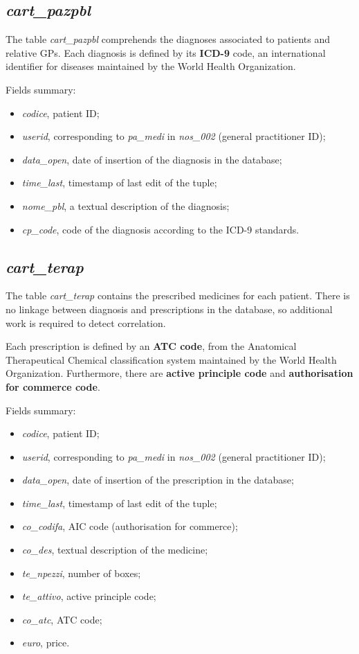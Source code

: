 \subsection{\textit{cart\_pazpbl}}
The table \textit{cart\_pazpbl} comprehends the diagnoses associated to patients and relative GPs. Each diagnosis is defined by its \textbf{ICD-9} code, an international identifier for diseases maintained by the World Health Organization. 

Fields summary:
\begin{itemize}
	\item \textit{codice}, patient ID;
	\item \textit{userid}, corresponding to \textit{pa\_medi }in \textit{nos\_002 }(general practitioner ID);
	\item \textit{data\_open}, date of insertion of the diagnosis in the database;
	\item \textit{time\_last}, timestamp of last edit of the tuple;
	\item \textit{nome\_pbl}, a textual description of the diagnosis;
	\item \textit{cp\_code}, code of the diagnosis according to the ICD-9 standards.
\end{itemize}

\subsection{\textit{cart\_terap}}
The table \textit{cart\_terap} contains the prescribed medicines for each patient. There is no linkage between diagnosis and prescriptions in the database, so additional work is required to detect correlation.

Each prescription is defined by an\textbf{ ATC code}, from the Anatomical Therapeutical Chemical classification system maintained by the World Health Organization. Furthermore, there are \textbf{active principle code} and \textbf{authorisation for commerce code}.

Fields summary:
\begin{itemize}
	\item \textit{codice}, patient ID;
	\item \textit{userid}, corresponding to \textit{pa\_medi }in \textit{nos\_002} (general practitioner ID);
	\item \textit{data\_open}, date of insertion of the prescription in the database;
	\item \textit{time\_last}, timestamp of last edit of the tuple;
	\item \textit{co\_codifa}, AIC code (authorisation for commerce);
	\item \textit{co\_des}, textual description of the medicine;
	\item \textit{te\_npezzi}, number of boxes;
	\item \textit{te\_attivo}, active principle code;
	\item \textit{co\_atc}, ATC code;
	\item \textit{euro}, price.
\end{itemize}

